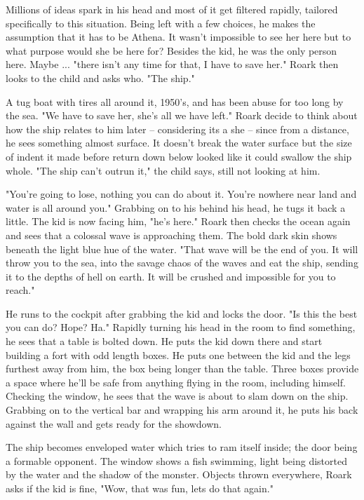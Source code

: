         Millions of ideas spark in his head and most of it get filtered rapidly, tailored specifically to this situation. Being left with a few
    choices, he makes the assumption that it has to be Athena. It wasn't impossible to see her here but to what purpose would she be here for?
    Besides the kid, he was the only person here. Maybe ... "there isn't any time for that, I have to save her." Roark then looks to the child
    and asks who. "The ship."

        A tug boat with tires all around it, 1950's, and has been abuse for too long by the sea. "We have to save her, she's all we have left."
    Roark decide to think about how the ship relates to him later -- considering its a she -- since from a distance, he sees something almost
    surface. It doesn't break the water surface but the size of indent it made before return down below looked like it could swallow the ship
    whole. "The ship can't outrun it," the child says, still not looking at him.

        "You're going to lose, nothing you can do about it. You're nowhere near land and water is all around you." Grabbing on to his behind
    his head, he tugs it back a little. The kid is now facing him, "he's here." Roark then checks the ocean again and sees that a colossal wave
    is approaching them. The bold dark skin shows beneath the light blue hue of the water. "That wave will be the end of you. It will throw
    you to the sea, into the savage chaos of the waves and eat the ship, sending it to the depths of hell on earth. It will be crushed and 
    impossible for you to reach."

        He runs to the cockpit after grabbing the kid and locks the door. "Is this the best you can do? Hope? Ha." Rapidly turning his head in
    the room to find something, he sees that a table is bolted down. He puts the kid down there and start building a fort with odd length boxes.
    He puts one between the kid and the legs furthest away from him, the box being longer than the table. Three boxes provide a space where
    he'll be safe from anything flying in the room, including himself. Checking the window, he sees that the wave is about to slam down on the 
    ship. Grabbing on to the vertical bar and wrapping his arm around it, he puts his back against the wall and gets ready for the showdown.

        The ship becomes enveloped water which tries to ram itself inside; the door being a formable opponent. The window shows a fish swimming,
    light being distorted by the water and the shadow of the monster. Objects thrown everywhere, Roark asks if the kid is fine, "Wow, that
    was fun, lets do that again."

